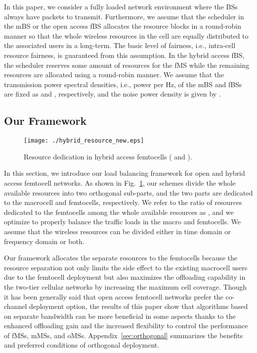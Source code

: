\documentclass[journal]{IEEEtran}
\begin{document}
In this paper, we
consider a fully loaded network environment where the BSs always have packets to transmit.
Furthermore, we assume that the scheduler in the mBS or the open access fBS
allocates the resource blocks in a round-robin manner
so that the whole wireless resources in the cell are equally distributed to
the associated users
in a long-term.
The basic level of fairness, i.e., intra-cell resource fairness,  is guaranteed
from this assumption.
In the hybrid access fBS, the scheduler reserves some amount of resources
for the fMS while the remaining resources are allocated using a round-robin manner.
We assume that the transmission power spectral densities, i.e., power per Hz,
of the mBS and fBSs are fixed as  and , respectively, and the noise power density is given by .


\subsection{Our Framework}
\label{sec:modeling}
\label{subsec:updated_formulation}
\begin{figure}
\begin{center}
\texttt{[image: ./hybrid\_resource\_new.eps]}
\caption{Resource dedication in hybrid access femtocells ( and ).}
\label{fig:hybrid_model}
\end{center}
\end{figure}

In this section, we introduce our load balancing framework
for open and hybrid access femtocell networks.
As shown in Fig.~\ref{fig:hybrid_model},
our schemes divide the whole available resources into two orthogonal sub-parts, and the two parts are dedicated to the macrocell and femtocells, respectively.
We refer to the ratio of resources dedicated to the femtocells
among the whole available resources as ,
and we optimize  to properly balance the traffic loads in the macro and femtocells.
We assume that the wireless resources can be divided either in time domain or frequency domain or both.

Our framework allocates the separate resources to the femtocells because
the resource separation not only limits the side effect to the existing macrocell users due to the femtocell deployment but also maximizes the offloading capability in the two-tier cellular networks by increasing the maximum cell coverage.
Though it has been generally said that open access femtocell networks prefer the co-channel deployment
option, the results of this paper show that
algorithms based on separate bandwidth can be more beneficial
in some aspects thanks to the enhanced
offloading gain and the increased flexibility to control the performance of fMSs, mMSs, and oMSs.
Appendix~\ref{sec:orthogonal} summarizes the benefits and preferred conditions of orthogonal deployment.
\end{document}
